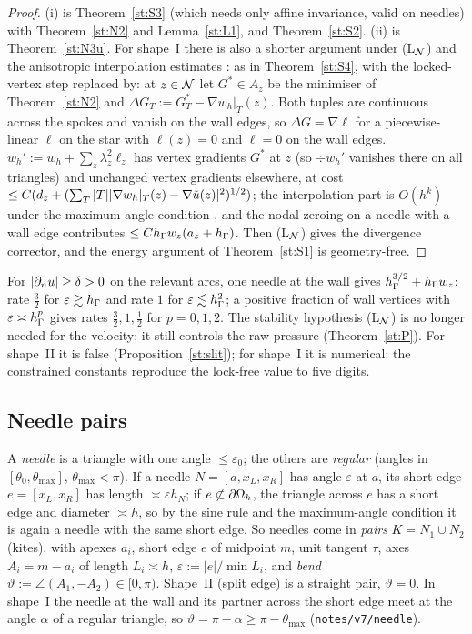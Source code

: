 \begin{proof}
(i) is Theorem~\ref{st:S3} (which needs only affine invariance, valid on needles) with Theorem~\ref{st:N2} and Lemma~\ref{st:L1}, and Theorem~\ref{st:S2}. (ii) is Theorem~\ref{st:N3u}. For shape~I there is also a shorter argument under (L$_\mathcal N$) and the anisotropic interpolation estimates \cite{BabuskaAziz1976,Apel1999}: as in Theorem~\ref{st:S4}, with the locked-vertex step replaced by: at $z\in\mathcal N$ let $G^\ast\in A_z$ be the minimiser of Theorem~\ref{st:N2} and $\Delta G_T:=G^\ast_T-\nabla w_h|_T(z)$. Both tuples are continuous across the spokes and vanish on the wall edges, so $\Delta G=\nabla\ell$ for a piecewise-linear $\ell$ on the star with $\ell(z)=0$ and $\ell=0$ on the wall edges. $w_h':=w_h+\sum_z\lambda_z^2\ell_z$ has vertex gradients $G^\ast$ at $z$ (so $\div w_h'$ vanishes there on all triangles) and unchanged vertex gradients elsewhere, at cost $\le C(d_z+(\sum_T|T||\nabla w_h|_T(z)-\nabla\tilde u(z)|^2)^{1/2})$; the interpolation part is $O(h^k)$ under the maximum angle condition \cite{BabuskaAziz1976,Apel1999}, and the nodal zeroing on a needle with a wall edge contributes $\le Ch_\Gamma w_z(a_z+h_\Gamma)$. Then (L$_\mathcal N$) gives the divergence corrector, and the energy argument of Theorem~\ref{st:S1} is geometry-free.
\end{proof}

For $|\partial_n u|\ge\delta>0$ on the relevant arcs, one needle at the wall gives $h_\Gamma^{3/2}+h_\Gamma w_z$: rate $\frac32$ for $\varepsilon\gtrsim h_\Gamma$ and rate $1$ for $\varepsilon\lesssim h_\Gamma^2$; a positive fraction of wall vertices with $\varepsilon\asymp h_\Gamma^p$ gives rates $\frac32,1,\frac12$ for $p=0,1,2$. The stability hypothesis (L$_\mathcal N$) is no longer needed for the velocity; it still controls the raw pressure (Theorem~\ref{st:P}). For shape~II it is false (Proposition~\ref{st:slit}); for shape~I it is numerical: the constrained constants reproduce the lock-free value to five digits.

\subsection{Needle pairs}\label{st:sec:pairs}

A \emph{needle} is a triangle with one angle $\le\varepsilon_0$; the others are \emph{regular} (angles in $[\theta_0,\theta_{\max}]$, $\theta_{\max}<\pi$). If a needle $N=[a,x_L,x_R]$ has angle $\varepsilon$ at $a$, its short edge $e=[x_L,x_R]$ has length $\asymp\varepsilon h_N$; if $e\not\subset\partial\Omega_h$, the triangle across $e$ has a short edge and diameter $\asymp h$, so by the sine rule and the maximum-angle condition it is again a needle with the same short edge. So needles come in \emph{pairs} $K=N_1\cup N_2$ (kites), with apexes $a_i$, short edge $e$ of midpoint $m$, unit tangent $\tau$, axes $A_i=m-a_i$ of length $L_i\asymp h$, $\varepsilon:=|e|/\min L_i$, and \emph{bend} $\vartheta:=\angle(A_1,-A_2)\in[0,\pi)$. Shape~II (split edge) is a straight pair, $\vartheta=0$. In shape~I the needle at the wall and its partner across the short edge meet at the angle $\alpha$ of a regular triangle, so $\vartheta=\pi-\alpha\ge\pi-\theta_{\max}$ (\texttt{notes/v7/needle}).

